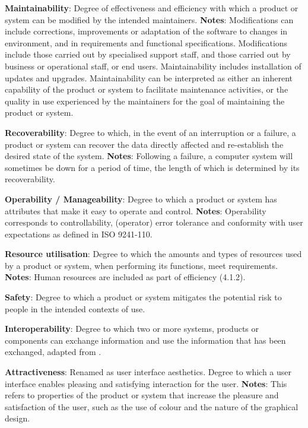 \textbf{Maintainability}: Degree of effectiveness and efficiency with which a product or system can be modified by the intended maintainers. \textbf{Notes}: Modifications can include corrections, improvements or adaptation of the software to changes in environment, and in requirements and functional specifications. Modifications include those carried out by specialised support staff, and those carried out by business or operational staff, or end users. Maintainability includes installation of updates and upgrades. Maintainability can be interpreted as either an inherent capability of the product or system to facilitate maintenance activities, or the quality in use experienced by the maintainers for the goal of maintaining the product or system.

\textbf{Recoverability}: Degree to which, in the event of an interruption or a failure, a product or system can recover the data directly affected and re-establish the desired state of the system. \textbf{Notes}: Following a failure, a computer system will sometimes be down for a period of time, the length of which is determined by its recoverability.

\textbf{Operability / Manageability}: Degree to which a product or system has attributes that make it easy to operate and control. \textbf{Notes}: Operability corresponds to controllability, (operator) error tolerance and conformity with user expectations as defined in ISO 9241-110.

\textbf{Resource utilisation}: Degree to which the amounts and types of resources used by a product or system, when performing its functions, meet requirements. \textbf{Notes}: Human resources are included as part of efficiency (4.1.2).

\textbf{Safety}: Degree to which a product or system mitigates the potential risk to people in the intended contexts of use.

\textbf{Interoperability}: Degree to which two or more systems, products or components can exchange information and use the information that has been exchanged, adapted from \cite{iso_central_secretary_isoiecieee_2010}.

\textbf{Attractiveness}: Renamed as user interface aesthetics. Degree to which a user interface enables pleasing and satisfying interaction for the user. \textbf{Notes}: This refers to properties of the product or system that increase the pleasure and satisfaction of the user, such as the use of colour and the nature of the graphical design.

